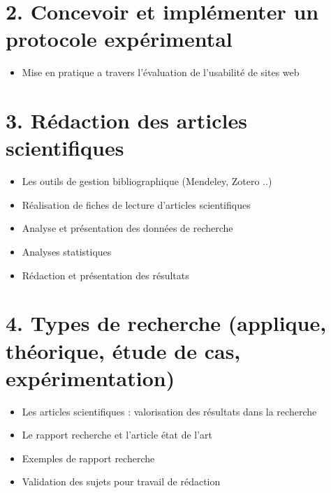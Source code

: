 \documentclass[
]{book}
\providecommand{\tightlist}{%
  \setlength{\itemsep}{0pt}\setlength{\parskip}{0pt}}
\begin{document}
\hypertarget{concevoir-et-impluxe9menter-un-protocole-expuxe9rimental}{%
\section{2. Concevoir et implémenter un protocole expérimental}\label{concevoir-et-impluxe9menter-un-protocole-expuxe9rimental}}

\begin{itemize}
\tightlist
\item
  Mise en pratique a travers l'évaluation de l'usabilité de sites web
\end{itemize}

\hypertarget{ruxe9daction-des-articles-scientifiques}{%
\section{3. Rédaction des articles scientifiques}\label{ruxe9daction-des-articles-scientifiques}}

\begin{itemize}
\tightlist
\item
  Les outils de gestion bibliographique (Mendeley, Zotero ..)
\item
  Réalisation de fiches de lecture d'articles scientifiques
\item
  Analyse et présentation des données de recherche
\item
  Analyses statistiques
\item
  Rédaction et présentation des résultats
\end{itemize}

\hypertarget{types-de-recherche-applique-thuxe9orique-uxe9tude-de-cas-expuxe9rimentation}{%
\section{4. Types de recherche (applique, théorique, étude de cas, expérimentation)}\label{types-de-recherche-applique-thuxe9orique-uxe9tude-de-cas-expuxe9rimentation}}

\begin{itemize}
\tightlist
\item
  Les articles scientifiques : valorisation des résultats dans la recherche
\item
  Le rapport recherche et l'article état de l'art
\item
  Exemples de rapport recherche
\item
  Validation des sujets pour travail de rédaction
\end{itemize}
\end{document}
